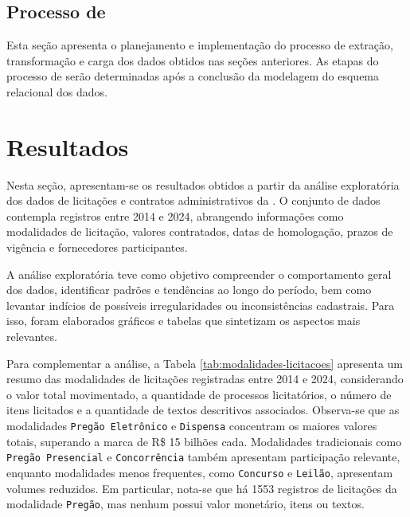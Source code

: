 \documentclass[
	12pt,				%
	oneside,			%
	a4paper,			%
	chapter=TITLE,		%
	section=TITLE,		%
	english,			%
	brazil				%
	]{abntex2}
\begin{document}
\section{Processo de }

Esta seção apresenta o planejamento e implementação do processo de extração, transformação e carga dos dados obtidos nas seções anteriores. As etapas do processo de  serão determinadas após a conclusão da modelagem do esquema relacional dos dados.

\chapter{Resultados}
\label{cap:Resultados}

Nesta seção, apresentam-se os resultados obtidos a partir da análise exploratória dos dados de licitações e contratos administrativos da . O conjunto de dados contempla registros entre 2014 e 2024, abrangendo informações como modalidades de licitação, valores contratados, datas de homologação, prazos de vigência e fornecedores participantes.

A análise exploratória teve como objetivo compreender o comportamento geral dos dados, identificar padrões e tendências ao longo do período, bem como levantar indícios de possíveis irregularidades ou inconsistências cadastrais. Para isso, foram elaborados gráficos e tabelas que sintetizam os aspectos mais relevantes.

Para complementar a análise, a Tabela \ref{tab:modalidades-licitacoes} apresenta um resumo das modalidades de licitações registradas entre 2014 e 2024, considerando o valor total movimentado, a quantidade de processos licitatórios, o número de itens licitados e a quantidade de textos descritivos associados. Observa-se que as modalidades \texttt{Pregão Eletrônico} e \texttt{Dispensa} concentram os maiores valores totais, superando a marca de R\$ 15 bilhões cada. Modalidades tradicionais como \texttt{Pregão Presencial} e \texttt{Concorrência} também apresentam participação relevante, enquanto modalidades menos frequentes, como \texttt{Concurso} e \texttt{Leilão}, apresentam volumes reduzidos. Em particular, nota-se que há 1553 registros de licitações da modalidade \texttt{Pregão}, mas nenhum possui valor monetário, itens ou textos. 
\end{document}
